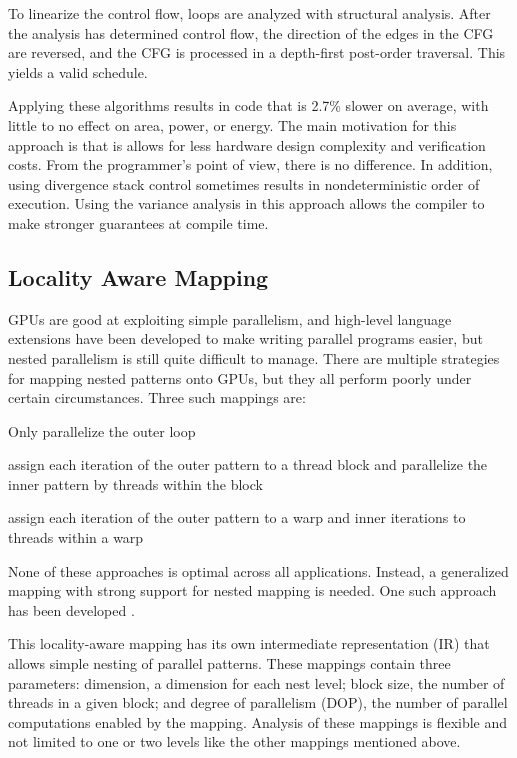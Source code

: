 \documentclass[prodmode,acmtecs]{acmsmall} %
\begin{document}
To linearize the control flow, loops are analyzed with structural analysis.
After the analysis has determined control flow, the direction of the edges in
the CFG are reversed, and the CFG is processed in a depth-first post-order
traversal. This yields a valid schedule.

Applying these algorithms results in code that is 2.7\% slower on average, with
little to no effect on area, power, or energy. The main motivation for this
approach is that is allows for less hardware design complexity and verification
costs. From the programmer's point of view, there is no difference. In addition,
using divergence stack control sometimes results in nondeterministic order of
execution. Using the variance analysis in this approach allows the compiler to
make stronger guarantees at compile time.

\subsection{Locality Aware Mapping}
GPUs are good at exploiting simple parallelism, and high-level language
extensions have been developed to make writing parallel programs easier, but
nested parallelism is still quite difficult to manage. There are multiple
strategies for mapping nested patterns onto GPUs, but they all perform poorly
under certain circumstances. Three such mappings are:
\begin{description}
  \setlength\itemsep{0.5em}
  \item[1D mapping] Only parallelize the outer loop
  \item[Thread-block/thread mapping]assign each iteration of the outer pattern
  to a thread block and parallelize the inner pattern by threads within the
  block
  \item[Warp-based mapping] assign each iteration of the outer pattern to a warp
  and inner iterations to threads within a warp
\end{description}
None of these approaches is optimal across all applications. Instead, a
generalized mapping with strong support for nested mapping is needed. One such
approach has been developed \cite{LocalityAwareMappingOfNestedParallelPatterns}.

This locality-aware mapping has its own intermediate representation (IR) that
allows simple nesting of parallel patterns. These mappings contain three
parameters: dimension, a dimension for each nest level; block size, the number
of threads in a given block; and degree of parallelism (DOP), the number of
parallel computations enabled by the mapping. Analysis of these mappings is
flexible and not limited to one or two levels like the other mappings mentioned
above.
\end{document}
